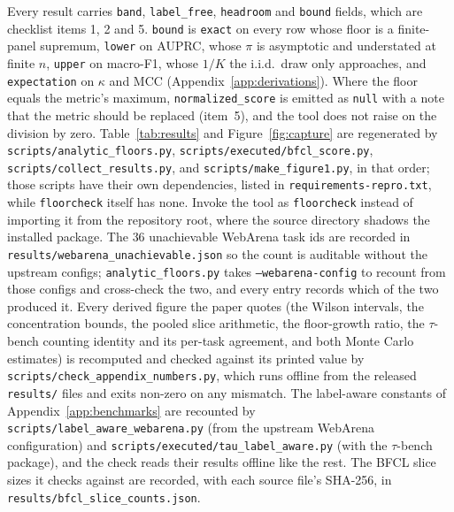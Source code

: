 \documentclass{article}
\theoremstyle{plain}
\theoremstyle{definition}
\newcommand{\floorcheck}{\texttt{floorcheck}}
\begin{document}
Every result carries \texttt{band}, \texttt{label\_free}, \texttt{headroom} and \texttt{bound} fields, which are checklist items 1, 2 and 5. \texttt{bound} is \texttt{exact} on every row whose floor is a finite-panel supremum, \texttt{lower} on AUPRC, whose $\pi$ is asymptotic and understated at finite $n$, \texttt{upper} on macro-F1, whose $1/K$ the i.i.d.\ draw only approaches, and \texttt{expectation} on $\kappa$ and MCC (Appendix~\ref{app:derivations}). Where the floor equals the metric's maximum, \texttt{normalized\_score} is emitted as \texttt{null} with a note that the metric should be replaced (item~5), and the tool does not raise on the division by zero.
Table~\ref{tab:results} and Figure~\ref{fig:capture} are regenerated by \texttt{scripts/analytic\_floors.py}, \texttt{scripts/executed/bfcl\_score.py}, \texttt{scripts/collect\_results.py}, and \texttt{scripts/make\_figure1.py}, in that order; those scripts have their own dependencies, listed in \texttt{requirements-repro.txt}, while \floorcheck{} itself has none. Invoke the tool as \texttt{floorcheck} instead of importing it from the repository root, where the source directory shadows the installed package. The $36$ unachievable WebArena task ids are recorded in \texttt{results/webarena\_unachievable.json} so the count is auditable without the upstream configs; \texttt{analytic\_floors.py} takes \texttt{--webarena-config} to recount from those configs and cross-check the two, and every entry records which of the two produced it. Every derived figure the paper quotes (the Wilson intervals, the concentration bounds, the pooled slice arithmetic, the floor-growth ratio, the $\tau$-bench counting identity and its per-task agreement, and both Monte Carlo estimates) is recomputed and checked against its printed value by \texttt{scripts/check\_appendix\_numbers.py}, which runs offline from the released \texttt{results/} files and exits non-zero on any mismatch. The label-aware constants of Appendix~\ref{app:benchmarks} are recounted by \texttt{scripts/label\_aware\_webarena.py} (from the upstream WebArena configuration) and \texttt{scripts/executed/tau\_label\_aware.py} (with the $\tau$-bench package), and the check reads their results offline like the rest. The BFCL slice sizes it checks against are recorded, with each source file's SHA-256, in \texttt{results/bfcl\_slice\_counts.json}.
\end{document}
